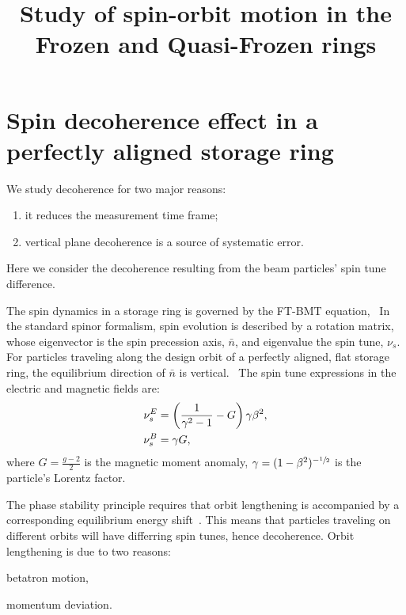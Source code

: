 \documentclass{article}
\begin{document}
\title{Study of spin-orbit motion in the Frozen and Quasi-Frozen rings}
\maketitle

\section{Spin decoherence effect in a perfectly aligned storage ring}

We study decoherence for two major reasons:
\begin{enumerate}
\item it reduces the measurement time frame;
\item vertical plane decoherence is a source of systematic error.~\cite[p. 8]{Senichev:StorageRingMethod}
\end{enumerate}

Here we consider the decoherence resulting from the beam particles' spin tune difference.

The spin dynamics in a storage ring is governed by the FT-BMT equation,~\cite[p. 4]{JEDI:SpinTuneMapping} In the standard spinor formalism, spin evolution is described by a rotation matrix, whose eigenvector is the spin precession axis, $\bar n$, and eigenvalue the spin tune, $\nu_s$. For particles traveling along the design orbit of a perfectly aligned, flat storage ring, the equilibrium direction of $\bar n$ is vertical.~\cite[p. 1362]{DESY:SpinTune} The spin tune expressions in the electric and magnetic fields are:~\cite[p. 8]{Senichev:StorageRingMethod}
\begin{align}
  \nu_s^E &= \bkt{\frac1{\gamma^2-1}-G}\gamma\beta^2, \\
  \nu_s^B &= \gamma G,
\end{align}
where $G = \frac{g-2}{2}$ is the magnetic moment anomaly, $\gamma = (1-\beta^2)^{-\sfrac12}$ is the particle's Lorentz factor. 

The phase stability principle requires that orbit lengthening is accompanied by a corresponding equilibrium energy shift~\cite{Senichev:Decoh}. This means that particles traveling on different orbits will have differring spin tunes, hence decoherence. Orbit lengthening is due to two reasons:
\begin{inparaenum}[a)]
\item betatron motion,
\item momentum deviation.
\end{inparaenum}
\end{document}

